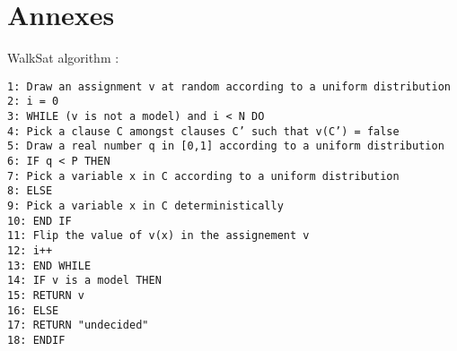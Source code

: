 \documentclass[a4paper]{article}
\begin{document}
\newpage

\section*{Annexes}
\label{sec:Annexes}

WalkSat algorithm :
	\begin{verbatim}
1: Draw an assignment v at random according to a uniform distribution
2: i = 0
3: WHILE (v is not a model) and i < N DO
4: Pick a clause C amongst clauses C’ such that v(C’) = false
5: Draw a real number q in [0,1] according to a uniform distribution
6: IF q < P THEN
7: Pick a variable x in C according to a uniform distribution
8: ELSE
9: Pick a variable x in C deterministically
10: END IF
11: Flip the value of v(x) in the assignement v
12: i++
13: END WHILE
14: IF v is a model THEN
15: RETURN v
16: ELSE
17: RETURN "undecided"
18: ENDIF
	\end{verbatim}
\end{document}
